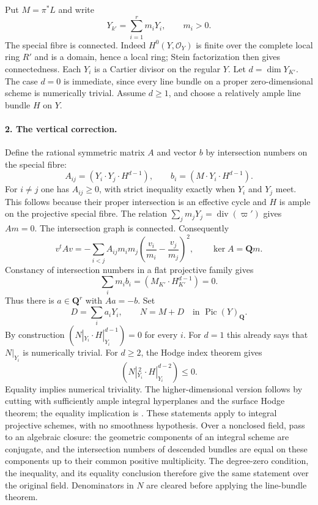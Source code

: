 Put $M=\pi^*L$ and write
\[
 Y_{k'}=\sum_{i=1}^r m_iY_i,\qquad m_i>0.                \tag{E4.T.2}
\]
The special fibre is connected. Indeed $H^0(Y,\mathcal O_Y)$ is finite
over the complete local ring $R'$ and is a domain, hence a local ring;
Stein factorization then gives connectedness. Each $Y_i$ is a Cartier
divisor on the regular $Y$. Let $d=\dim Y_{K'}$. The case $d=0$ is
immediate, since every line bundle on a proper zero-dimensional scheme
is numerically trivial. Assume $d\geq1$, and choose a relatively ample
line bundle $H$ on $Y$.

\paragraph{2. The vertical correction.}
Define the rational symmetric matrix $A$ and vector $b$ by intersection
numbers on the special fibre:
\[
 A_{ij}=(Y_i\cdot Y_j\cdot H^{d-1}),\qquad
 b_i=(M\cdot Y_i\cdot H^{d-1}).                          \tag{E4.T.3}
\]
For $i\ne j$ one has $A_{ij}\geq0$, with strict inequality exactly when
$Y_i$ and $Y_j$ meet. This follows because their proper intersection is
an effective cycle and $H$ is ample on the projective special fibre.
The relation $\sum_jm_jY_j=\operatorname{div}(\varpi')$ gives $Am=0$.
The intersection graph is connected. Consequently
\[
 v^tAv=-\sum_{i<j}A_{ij}m_im_j
       \left(\frac{v_i}{m_i}-\frac{v_j}{m_j}\right)^2,
 \qquad \ker A=\mathbf Qm.                              \tag{E4.T.4}
\]
Constancy of intersection numbers in a flat projective family gives
\[
 \sum_i m_i b_i=(M_{K'}\cdot H_{K'}^{d-1})=0.
\]
Thus there is $a\in\mathbf Q^r$ with $Aa=-b$. Set
\[
 D=\sum_i a_iY_i,\qquad N=M+D\quad\text{in }\operatorname{Pic}(Y)_\mathbf Q.
                                                               \tag{E4.T.5}
\]
By construction $(N|_{Y_i}\cdot H|_{Y_i}^{d-1})=0$ for every $i$.
For $d=1$ this already says that $N|_{Y_i}$ is numerically trivial.
For $d\geq2$, the Hodge index theorem gives
\[
 (N|_{Y_i}^{\,2}\cdot H|_{Y_i}^{d-2})\leq0.             \tag{E4.T.6}
\]
Equality implies numerical triviality. The higher-dimensional version
follows by cutting with sufficiently ample integral hyperplanes and the
surface Hodge theorem; the equality implication is
\cite[Theorem~6.3(h), proof pp.~53--54, and Theorem~B.27, p.~79]{Kleiman2005}.
These statements apply to integral projective schemes, with no smoothness
hypothesis. Over a nonclosed field, pass to an algebraic closure: the
geometric components of an integral scheme are conjugate, and the
intersection numbers of descended bundles are equal on these components
up to their common positive multiplicity. The degree-zero condition,
the inequality, and its equality conclusion therefore give the same
statement over the original field. Denominators in $N$ are cleared before
applying the line-bundle theorem.

